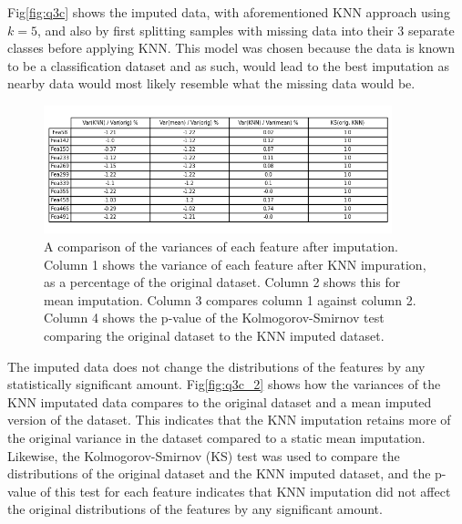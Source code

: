     Fig\eqref{fig:q3c} shows the imputed data, with aforementioned KNN approach using $k=5$, and also by first splitting
    samples with missing data into their 3 separate classes before applying KNN.
    This model was chosen because the data is known to be a classification dataset and as such, would lead to the best
    imputation as nearby data would most likely resemble what the missing data would be.

    \begin{figure}[htb]
    \centering
    \includegraphics[width=0.9\textwidth]{./figures/q3c_2}
    \caption{A comparison of the variances of each feature after imputation. Column 1 shows the variance of each feature
        after KNN impuration, as a percentage of the original dataset. Column 2 shows this for mean imputation.
        Column 3 compares column 1 against column 2. Column 4 shows the p-value of the Kolmogorov-Smirnov test comparing
        the original dataset to the KNN imputed dataset.}
    \label{fig:q3c_2}
    \end{figure}

    The imputed data does not change the distributions of the features by any statistically significant amount.
    Fig\eqref{fig:q3c_2} shows how the variances of the KNN imputated data compares to the original dataset and a mean
    imputed version of the dataset.
    This indicates that the KNN imputation retains more of the original variance in the dataset compared to a static
    mean imputation.
    Likewise, the Kolmogorov-Smirnov (KS) test was used to compare the distributions of the original dataset and the KNN
    imputed dataset, and the p-value of this test for each feature indicates that KNN imputation did not affect the
    original distributions of the features by any significant amount.
